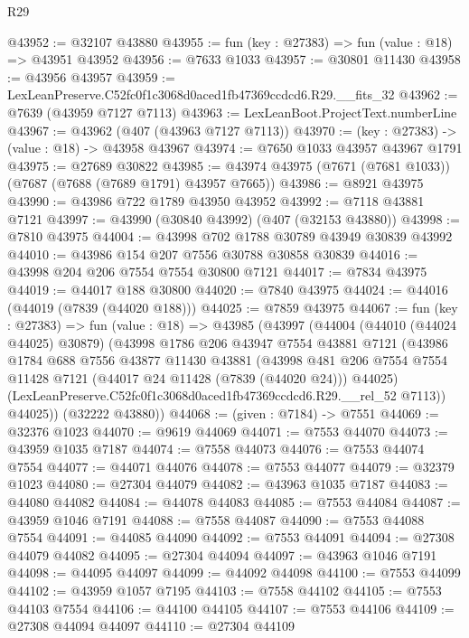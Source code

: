 \begin{lexlean}{R29}
\begin{coremodule}
@43952 := @32107 @43880
@43955 := fun (key : @27383) => fun (value : @18) => @43951 @43952
@43956 := @7633 @1033
@43957 := @30801 @11430
@43958 := @43956 @43957
@43959 := LexLeanPreserve.C52fc0f1c3068d0aced1fb47369ccdcd6.R29.__fits_32
@43962 := @7639 (@43959 @7127 @7113)
@43963 := LexLeanBoot.ProjectText.numberLine
@43967 := @43962 (@407 (@43963 @7127 @7113))
@43970 := (key : @27383) -> (value : @18) -> @43958 @43967
@43974 := @7650 @1033 @43957 @43967 @1791
@43975 := @27689 @30822
@43985 := @43974 @43975 (@7671 (@7681 @1033)) (@7687 (@7688 (@7689 @1791) @43957 @7665))
@43986 := @8921 @43975
@43990 := @43986 @722 @1789 @43950 @43952
@43992 := @7118 @43881 @7121
@43997 := @43990 (@30840 @43992) (@407 (@32153 @43880))
@43998 := @7810 @43975
@44004 := @43998 @702 @1788 @30789 @43949 @30839 @43992
@44010 := @43986 @154 @207 @7556 @30788 @30858 @30839
@44016 := @43998 @204 @206 @7554 @7554 @30800 @7121
@44017 := @7834 @43975
@44019 := @44017 @188 @30800
@44020 := @7840 @43975
@44024 := @44016 (@44019 (@7839 (@44020 @188)))
@44025 := @7859 @43975
@44067 := fun (key : @27383) =>
  fun (value : @18) =>
  @43985
    (@43997
      (@44004
        (@44010 (@44024 @44025) @30879)
        (@43998
          @1786
          @206
          @43947
          @7554
          @43881
          @7121
          (@43986
            @1784
            @688
            @7556
            @43877
            @11430
            @43881
            (@43998
              @481
              @206
              @7554
              @7554
              @11428
              @7121
              (@44017 @24 @11428 (@7839 (@44020 @24)))
              @44025)
            (LexLeanPreserve.C52fc0f1c3068d0aced1fb47369ccdcd6.R29.__rel_52 @7113))
          @44025))
      (@32222 @43880))
@44068 := (given : @7184) -> @7551
@44069 := @32376 @1023
@44070 := @9619 @44069
@44071 := @7553 @44070
@44073 := @43959 @1035 @7187
@44074 := @7558 @44073
@44076 := @7553 @44074 @7554
@44077 := @44071 @44076
@44078 := @7553 @44077
@44079 := @32379 @1023
@44080 := @27304 @44079
@44082 := @43963 @1035 @7187
@44083 := @44080 @44082
@44084 := @44078 @44083
@44085 := @7553 @44084
@44087 := @43959 @1046 @7191
@44088 := @7558 @44087
@44090 := @7553 @44088 @7554
@44091 := @44085 @44090
@44092 := @7553 @44091
@44094 := @27308 @44079 @44082
@44095 := @27304 @44094
@44097 := @43963 @1046 @7191
@44098 := @44095 @44097
@44099 := @44092 @44098
@44100 := @7553 @44099
@44102 := @43959 @1057 @7195
@44103 := @7558 @44102
@44105 := @7553 @44103 @7554
@44106 := @44100 @44105
@44107 := @7553 @44106
@44109 := @27308 @44094 @44097
@44110 := @27304 @44109

\end{coremodule}
\end{lexlean}
